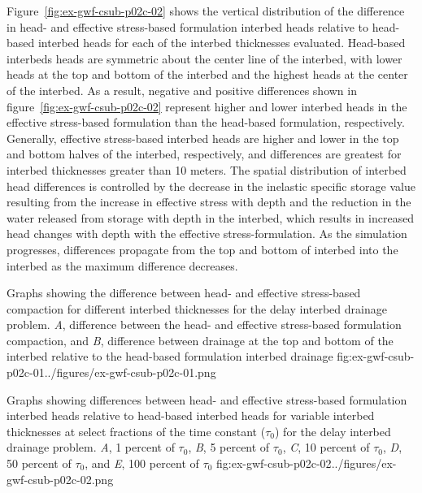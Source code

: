 Figure~\ref{fig:ex-gwf-csub-p02c-02} shows the vertical distribution of the difference in head- and effective stress-based formulation interbed heads relative to head-based interbed heads for each of the interbed thicknesses evaluated. Head-based interbeds heads are symmetric about the center line of the interbed, with lower heads at the top and bottom of the interbed and the highest heads at the center of the interbed. As a result, negative and positive differences shown in figure~\ref{fig:ex-gwf-csub-p02c-02} represent higher and lower interbed heads in the effective stress-based formulation than the head-based formulation, respectively. Generally, effective stress-based interbed heads are higher and lower in the top and bottom halves of the interbed, respectively, and differences are greatest for interbed thicknesses greater than 10 meters. The spatial distribution of interbed head differences is controlled by the decrease in the inelastic specific storage value resulting from the increase in effective stress with depth and the reduction in the water released from storage with depth in the interbed, which results in increased head changes with depth with the effective stress-formulation. As the simulation progresses, differences propagate from the top and bottom of interbed into the interbed as the maximum difference decreases.

\begin{StandardFigure}{
                                     Graphs showing the difference between head- and effective 
                                     stress-based compaction for different interbed thicknesses for the 
                                     delay interbed drainage problem. \textit{A}, difference between the 
                                     head- and effective stress-based formulation compaction, and 
                                     \textit{B}, difference between drainage at the top and bottom of the 
                                     interbed relative to the head-based formulation interbed drainage
                                     }{fig:ex-gwf-csub-p02c-01}{../figures/ex-gwf-csub-p02c-01.png}
\end{StandardFigure}         

\begin{StandardFigure}{
                                     Graphs showing differences between head- and effective stress-based 
                                     formulation interbed heads relative to head-based interbed heads for variable 
                                     interbed thicknesses at select fractions of the time constant ($\tau_0$) for the 
                                     delay interbed drainage problem. \textit{A}, 1 percent of $\tau_0$, \textit{B}, 
                                     5 percent of $\tau_0$, \textit{C}, 10 percent of $\tau_0$, \textit{D}, 50 percent 
                                     of $\tau_0$,  and \textit{E}, 100 percent of $\tau_0$
                                     }{fig:ex-gwf-csub-p02c-02}{../figures/ex-gwf-csub-p02c-02.png}
\end{StandardFigure}         



